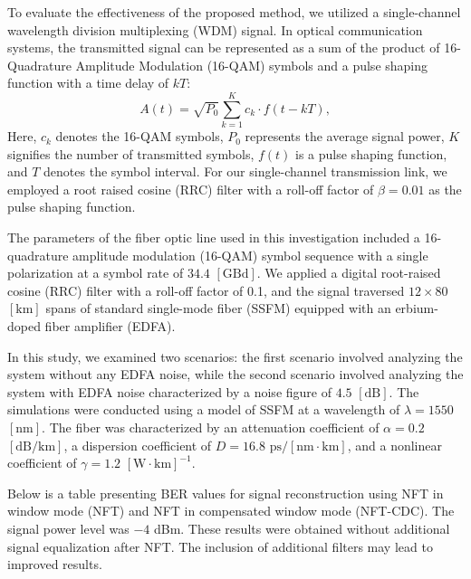 To evaluate the effectiveness of the proposed method, we utilized a single-channel wavelength division multiplexing (WDM) signal. In optical communication systems, the transmitted signal can be represented as a sum of the product of 16-Quadrature Amplitude Modulation (16-QAM) symbols and a pulse shaping function with a time delay of $kT$:
\begin{equation}
A(t)= \sqrt{P_0} \sum_{k=1}^K c_k \cdot f(t- k T),
\end{equation}
Here, $c_k$ denotes the 16-QAM symbols, $P_0$ represents the average signal power, $K$ signifies the number of transmitted symbols, $f(t)$ is a pulse shaping function, and $T$ denotes the symbol interval. For our single-channel transmission link, we employed a root raised cosine (RRC) filter with a roll-off factor of $\beta = 0.01$ as the pulse shaping function.

The parameters of the fiber optic line used in this investigation included a 16-quadrature amplitude modulation (16-QAM) symbol sequence with a single polarization at a symbol rate of $34.4$ $[\textrm{GBd}]$. We applied a digital root-raised cosine (RRC) filter with a roll-off factor of 0.1, and the signal traversed $12 \times 80$ $[\textrm{km}]$ spans of standard single-mode fiber (SSFM) equipped with an erbium-doped fiber amplifier (EDFA).

In this study, we examined two scenarios: the first scenario involved analyzing the system without any EDFA noise, while the second scenario involved analyzing the system with EDFA noise characterized by a noise figure of $4.5$ $[\textrm{dB}]$. The simulations were conducted using a model of SSFM at a wavelength of $\lambda = 1550$ $[\textrm{nm}]$. The fiber was characterized by an attenuation coefficient of $\alpha = 0.2$ $[\textrm{dB}/\textrm{km}]$, a dispersion coefficient of $D = 16.8$ $\textrm{ps}/[\textrm{nm} \cdot \textrm{km}]$, and a nonlinear coefficient of $\gamma = 1.2$ $[\textrm{W} \cdot \textrm{km}]^{-1}$.

Below is a table presenting BER values for signal reconstruction using NFT in window mode (NFT) and NFT in compensated window mode (NFT-CDC). The signal power level was $-4$ dBm. These results were obtained without additional signal equalization after NFT. The inclusion of additional filters may lead to improved results.

